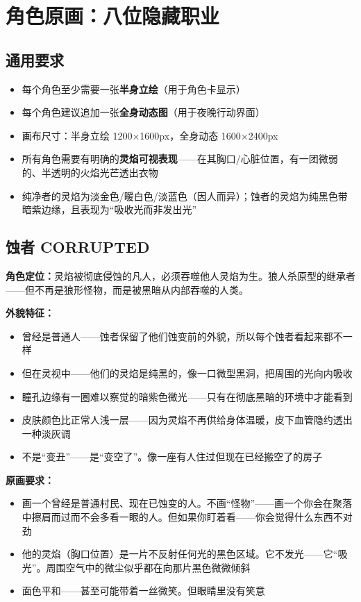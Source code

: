 \documentclass[12pt,a4paper,openany]{ctexbook}
\begin{document}
\chapter{角色原画：八位隐藏职业}

\section{通用要求}

\begin{itemize}
    \item 每个角色至少需要一张\textbf{半身立绘}（用于角色卡显示）
    \item 每个角色建议追加一张\textbf{全身动态图}（用于夜晚行动界面）
    \item 画布尺寸：半身立绘 1200×1600px，全身动态 1600×2400px
    \item 所有角色需要有明确的\textbf{灵焰可视表现}——在其胸口/心脏位置，有一团微弱的、半透明的火焰光芒透出衣物
    \item 纯净者的灵焰为淡金色/暖白色/淡蓝色（因人而异）；蚀者的灵焰为纯黑色带暗紫边缘，且表现为“吸收光而非发出光”
\end{itemize}

\section{蚀者 CORRUPTED}

\textbf{角色定位：}灵焰被彻底侵蚀的凡人，必须吞噬他人灵焰为生。狼人杀原型的继承者——但不再是狼形怪物，而是被黑暗从内部吞噬的人类。

\textbf{外貌特征：}
\begin{itemize}
    \item 曾经是普通人——蚀者保留了他们蚀变前的外貌，所以每个蚀者看起来都不一样
    \item 但在灵视中——他们的灵焰是纯黑的，像一口微型黑洞，把周围的光向内吸收
    \item 瞳孔边缘有一圈难以察觉的暗紫色微光——只有在彻底黑暗的环境中才能看到
    \item 皮肤颜色比正常人浅一层——因为灵焰不再供给身体温暖，皮下血管隐约透出一种淡灰调
    \item 不是“变丑”——是“变空了”。像一座有人住过但现在已经搬空了的房子
\end{itemize}

\textbf{原画要求：}
\begin{itemize}
    \item 画一个曾经是普通村民、现在已蚀变的人。不画“怪物”——画一个你会在聚落中擦肩而过而不会多看一眼的人。但如果你盯着看——你会觉得什么东西不对劲
    \item 他的灵焰（胸口位置）是一片不反射任何光的黑色区域。它不发光——它“吸光”。周围空气中的微尘似乎都在向那片黑色微微倾斜
    \item 面色平和——甚至可能带着一丝微笑。但眼睛里没有笑意
\end{itemize}
\end{document}
